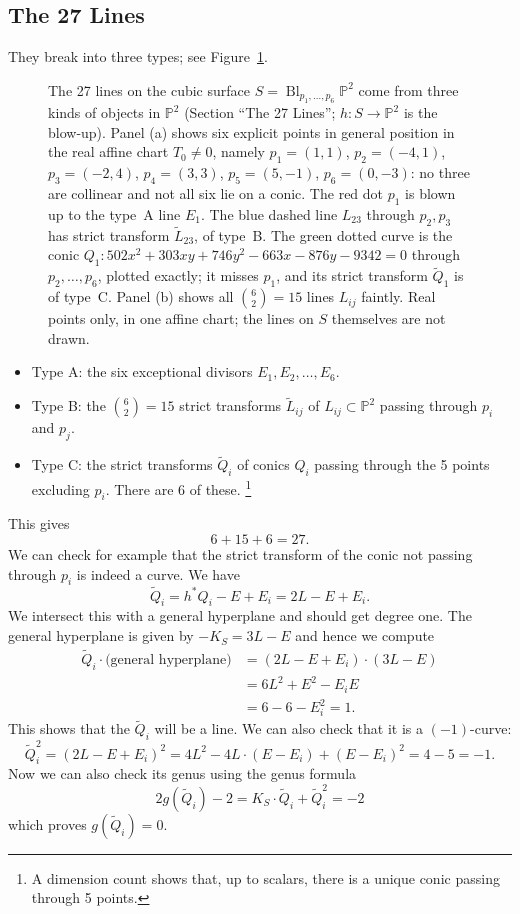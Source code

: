 \documentclass[12pt]{article}
\numberwithin{equation}{section}
\theoremstyle{definition}
\theoremstyle{remark}
\newcommand{\PP}{\mathbb{P}}
\newcommand{\Bl}{\operatorname{Bl}}
\begin{document}
\subsection{The 27 Lines}
They break into three types; see Figure~\ref{fig:three-types-of-lines}.
\begin{figure}[H]
\centering

\caption{The 27 lines on the cubic surface $S=\Bl_{p_1,\ldots,p_6}\PP^2$ come from three kinds of objects in $\PP^2$ (Section ``The 27 Lines''; $h\colon S\to\PP^2$ is the blow-up). Panel (a) shows six explicit points in general position in the real affine chart $T_0\neq0$, namely $p_1=(1,1)$, $p_2=(-4,1)$, $p_3=(-2,4)$, $p_4=(3,3)$, $p_5=(5,-1)$, $p_6=(0,-3)$: no three are collinear and not all six lie on a conic. The red dot $p_1$ is blown up to the type~A line $E_1$. The blue dashed line $L_{23}$ through $p_2,p_3$ has strict transform $\widetilde L_{23}$, of type~B. The green dotted curve is the conic $Q_1\colon 502x^2+303xy+746y^2-663x-876y-9342=0$ through $p_2,\ldots,p_6$, plotted exactly; it misses $p_1$, and its strict transform $\widetilde Q_1$ is of type~C. Panel (b) shows all $\binom62=15$ lines $L_{ij}$ faintly. Real points only, in one affine chart; the lines on $S$ themselves are not drawn.}\label{fig:three-types-of-lines}
\end{figure}
\begin{itemize}
	\item Type A: the six exceptional divisors $E_1,E_2,\ldots,E_6$.
	\item Type B: the ${6 \choose 2}=15$ strict transforms $\widetilde{L}_{ij}$ of $L_{ij} \subset \PP^2$ passing through $p_i$ and $p_j$.
	\item Type C: the strict transforms $\widetilde{Q}_i$ of conics $Q_i$ passing through the 5 points excluding $p_i$. There are 6 of these. \footnote{A dimension count shows that, up to scalars, there is a unique conic passing through 5 points.}
\end{itemize}

This gives 
$$ 6 + 15 + 6 = 27.$$
We can check for example that the strict transform of the conic not passing through $p_i$ is indeed a curve. 
We have 
$$ \widetilde{Q}_i = h^*Q_i - E + E_i = 2L-E+E_i. $$
We intersect this with a general hyperplane and should get degree one. 
The general hyperplane is given by $ -K_S=3L - E$
and hence we compute 
\begin{align*}
\widetilde{Q}_i \cdot \mbox{(general hyperplane)} &= (2L-E+E_i)\cdot (3L-E) \\
&=6L^2+E^2-E_iE\\
&=6-6-E_i^2=1.
\end{align*}
This shows that the $\widetilde{Q}_i$ will be a line. 
We can also check that it is a $(-1)$-curve:
$$\widetilde{Q}_i^2 = (2L-E+E_i)^2 = 4L^2-4L\cdot (E-E_i) + (E-E_i)^2=4-5=-1.$$
Now we can also check its genus using the genus formula
$$ 2g(\widetilde{Q}_i) -2 = K_S\cdot \widetilde{Q}_i +\widetilde{Q}_i^2 = -2$$
which proves $g(\widetilde{Q}_i)=0$.
\end{document}
